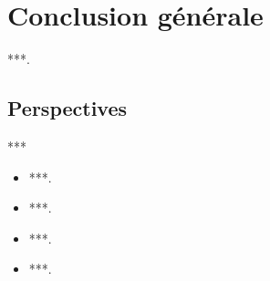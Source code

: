 \chapter*{Conclusion générale}
{}

***.

\section*{Perspectives}
***

\begin{itemize}[label = \scriptsize$\blacktriangleright$]
\item ***.
\item ***.
\item ***.
\item ***.
\end{itemize}